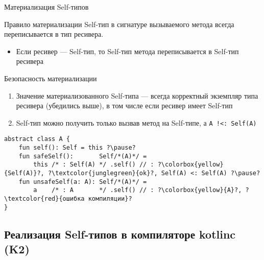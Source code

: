 \documentclass[aspectratio=169,usenames,dvipsnames]{beamer}
\begin{document}
    \begin{frame}[fragile]{Материализация Self-типов}
        \begin{block}{Правило материализации}
            Self-тип в сигнатуре вызываемого метода всегда переписывается в тип ресивера.
            \begin{itemize}
                \item Если ресивер --- Self-тип, то Self-тип метода переписывается в Self-тип ресивера
            \end{itemize}
        \end{block}
        \pause
        \begin{block}{Безопасность материализации}
            \begin{enumerate}
                \item Значение материализованного Self-типа --- всегда корректный экземпляр типа ресивера (убедились выше), в том числе если ресивер имеет Self-тип
                \item Self-тип можно получить только вызвав метод на Self-типе, а \texttt{A !<: Self(A)}
            \end{enumerate} \pause
            \begin{verbatim}
abstract class A {
    fun self(): Self = this ?\pause?
    fun safeSelf():       Self/*(A)*/ =
        this /* : Self(A) */ .self() // : ?\colorbox{yellow}{Self(A)}?, ?\textcolor{junglegreen}{ok}?, Self(A) <: Self(A) ?\pause?
    fun unsafeSelf(a: A): Self/*(A)*/ =
        a    /* : A       */ .self() // : ?\colorbox{yellow}{A}?, ?\textcolor{red}{ошибка компиляции}?
}
            \end{verbatim}
        \end{block}
    \end{frame}

    \subsection{Реализация Self-типов в компиляторе kotlinc (K2)}
\end{document}
